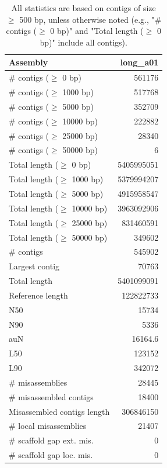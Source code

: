 \documentclass[12pt,a4paper]{article}
\begin{document}
\begin{table}[ht]
\begin{center}
\caption{All statistics are based on contigs of size $\geq$ 500 bp, unless otherwise noted (e.g., "\# contigs ($\geq$ 0 bp)" and "Total length ($\geq$ 0 bp)" include all contigs).}
\begin{tabular}{|l*{1}{|r}|}
\hline
Assembly & long\_a01 \\ \hline
\# contigs ($\geq$ 0 bp) & 561176 \\ \hline
\# contigs ($\geq$ 1000 bp) & 517768 \\ \hline
\# contigs ($\geq$ 5000 bp) & 352709 \\ \hline
\# contigs ($\geq$ 10000 bp) & 222882 \\ \hline
\# contigs ($\geq$ 25000 bp) & 28340 \\ \hline
\# contigs ($\geq$ 50000 bp) & 6 \\ \hline
Total length ($\geq$ 0 bp) & 5405995051 \\ \hline
Total length ($\geq$ 1000 bp) & 5379994207 \\ \hline
Total length ($\geq$ 5000 bp) & 4915958547 \\ \hline
Total length ($\geq$ 10000 bp) & 3963092906 \\ \hline
Total length ($\geq$ 25000 bp) & 831460591 \\ \hline
Total length ($\geq$ 50000 bp) & 349602 \\ \hline
\# contigs & 545902 \\ \hline
Largest contig & 70763 \\ \hline
Total length & 5401099091 \\ \hline
Reference length & 122822733 \\ \hline
N50 & 15734 \\ \hline
N90 & 5336 \\ \hline
auN & 16164.6 \\ \hline
L50 & 123152 \\ \hline
L90 & 342072 \\ \hline
\# misassemblies & 28445 \\ \hline
\# misassembled contigs & 18400 \\ \hline
Misassembled contigs length & 306846150 \\ \hline
\# local misassemblies & 21407 \\ \hline
\# scaffold gap ext. mis. & 0 \\ \hline
\# scaffold gap loc. mis. & 0 \\ \hline

\end{tabular}
\end{center}
\end{table}
\end{document}
